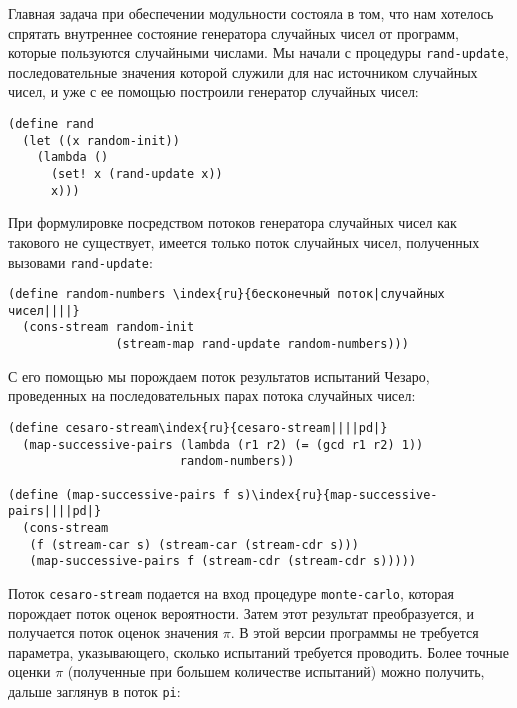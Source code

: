 Главная задача при обеспечении модульности состояла в том,
что нам хотелось спрятать внутреннее состояние генератора случайных
чисел от программ, которые пользуются случайными числами.  Мы начали с
процедуры {\tt rand-update}, последовательные
значения которой служили для нас источником случайных чисел, и уже с
ее помощью построили генератор случайных чисел:

\begin{Verbatim}[fontsize=\small]
(define rand
  (let ((x random-init))
    (lambda ()
      (set! x (rand-update x))
      x)))
\end{Verbatim}

При формулировке посредством потоков генератора случайных
чисел как такового не существует, имеется только поток случайных
чисел, полученных вызовами {\tt rand-update}:

\begin{Verbatim}[fontsize=\small]
(define random-numbers \index{ru}{бесконечный поток|случайных чисел||||}
  (cons-stream random-init
               (stream-map rand-update random-numbers)))
\end{Verbatim}
С его помощью мы порождаем поток результатов испытаний Чезаро,
проведенных на последовательных парах потока случайных чисел:

\begin{Verbatim}[fontsize=\small]
(define cesaro-stream\index{ru}{cesaro-stream||||pd|}
  (map-successive-pairs (lambda (r1 r2) (= (gcd r1 r2) 1))
                        random-numbers))

(define (map-successive-pairs f s)\index{ru}{map-successive-pairs||||pd|}
  (cons-stream
   (f (stream-car s) (stream-car (stream-cdr s)))
   (map-successive-pairs f (stream-cdr (stream-cdr s)))))
\end{Verbatim}
Поток {\tt cesaro-stream} подается на вход процедуре
{\tt monte-carlo}, которая порождает поток оценок вероятности.
Затем этот результат преобразуется, и получается поток оценок значения
$\pi$.  В этой версии программы не требуется параметра,
указывающего, сколько испытаний требуется проводить.  Более точные
оценки $\pi$ (полученные при большем количестве испытаний)
можно получить, дальше заглянув в поток {\tt pi}:

